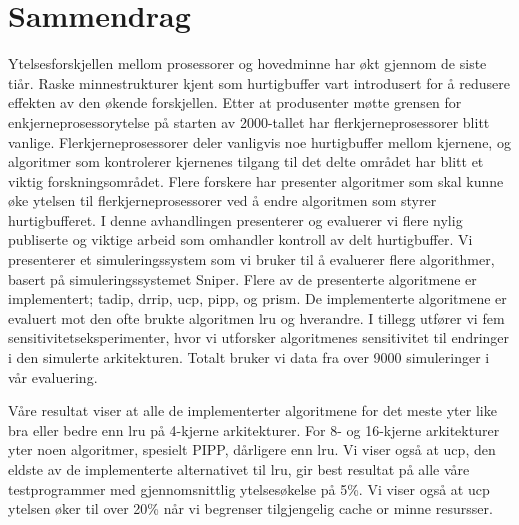 \section*{Sammendrag}
Ytelsesforskjellen mellom prosessorer og hovedminne har økt gjennom de siste tiår.
Raske minnestrukturer kjent som hurtigbuffer vart introdusert for å redusere effekten av den økende forskjellen.
Etter at produsenter møtte grensen for enkjerneprosessorytelse på starten av 2000-tallet har flerkjerneprosessorer blitt vanlige.
Flerkjerneprosessorer deler vanligvis noe hurtigbuffer mellom kjernene, og algoritmer som kontrolerer kjernenes tilgang til det delte området har blitt et viktig forskningsområdet.
Flere forskere har presenter algoritmer som skal kunne øke ytelsen til flerkjerneprosessorer ved å endre algoritmen som styrer hurtigbufferet.
I denne avhandlingen presenterer og evaluerer vi flere nylig publiserte og viktige arbeid som omhandler kontroll av delt hurtigbuffer.
Vi presenterer et simuleringssystem som vi bruker til å evaluerer flere algorithmer, basert på simuleringssystemet Sniper.
Flere av de presenterte algoritmene er implementert; \gls{tadip}, \gls{drrip}, \gls{ucp}, \gls{pipp}, og \gls{prism}.
De implementerte algoritmene er evaluert mot den ofte brukte algoritmen \gls{lru} og hverandre.
I tillegg utfører vi fem sensitivitetseksperimenter, hvor vi utforsker algoritmenes sensitivitet til endringer i den simulerte arkitekturen.
Totalt bruker vi data fra over 9000 simuleringer i vår evaluering.

Våre resultat viser at alle de implementerter algoritmene for det meste yter like bra eller bedre enn \gls{lru} på 4-kjerne arkitekturer.
For 8- og 16-kjerne arkitekturer yter noen algoritmer, spesielt PIPP, dårligere enn \gls{lru}.
Vi viser også at \gls{ucp}, den eldste av de implementerte alternativet til \gls{lru}, gir best resultat på alle våre testprogrammer med gjennomsnittlig ytelsesøkelse på 5\%.
Vi viser også at \gls{ucp} ytelsen øker til over 20\% når vi begrenser tilgjengelig cache or minne resursser.

\clearpage